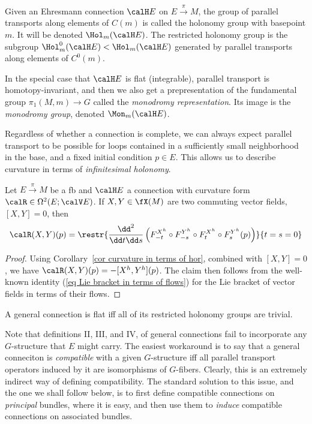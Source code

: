 \begin{defn}
    Given an Ehresmann connection $\calH E$ on $E\overset{\pi}{\to}M$, the group of parallel transports along elements of $C(m)$ is called the holonomy group  with basepoint $m$. It will be denoted $\Hol_m(\calH E)$. The restricted holonomy group is the subgroup $\Hol^0_m(\calH E)<\Hol_m(\calH E)$ generated by parallel transports along elements of $C^0(m)$.
\end{defn}

\begin{defn}
    In the special case that $\calH E$ is flat (integrable), parallel transport is homotopy-invariant, and then we also get a prepresentation of the fundamental group $\pi_1(M,m)\to G$ called the \emph{monodromy representation}. Its image is the \emph{monodromy group}, denoted $\Mon_m(\calH E)$.
\end{defn}

Regardless of whether a connection is complete, we can always expect parallel transport to be possible for loops contained in a sufficiently small neighborhood in the base, and a fixed initial condition $p\in E$. This allows us to describe curvature in terms of \emph{infinitesimal holonomy}.

\begin{prop}
    Let $E\overset{\pi}{\to}M$ be a \gls{fb} and $\calH E$ a connection with curvature form $\calR\in\Omega^2(E;\calV E)$. If $X,Y\in\fX(M)$ are two commuting vector fields, $[X,Y]=0$, then 
    \[\calR(X,Y)(p)=\restr{\frac{\dd^2}{\dd t\dd s}\left(
    F^{X^h}_{-t}\circ F^{Y^h}_{-s}\circ F^{X^h}_t\circ F^{Y^h}_s(p)
    \right)}{t=s=0}\]
\end{prop}
\begin{proof}
    Using Corollary~\ref{cor curvature in terms of hor}, combined with $[X,Y]=0$, we have $\calR(X,Y)(p)=-[X^h,Y^h](p)$. The claim then follows from the well-known identity (\ref{eq Lie bracket in terms of flows}) for the Lie bracket of vector fields in terms of their flows.
\end{proof}
\begin{cor}
    A general connection is flat iff all of its restricted holonomy groups are trivial.
\end{cor}

\begin{rem}
    Note that definitions II, III, and IV, of general connections fail to incorporate any $G$-structure that $E$ might carry. The easiest workaround is to say that a general conneciton is \emph{compatible} with a given $G$-structure iff all parallel transport operators induced by it are isomorphisms of $G$-fibers. Clearly, this is an extremely indirect way of defining compatibility. The standard solution to this issue, and the one we shall follow below, is to first define compatible connections on \emph{principal} bundles, where it is easy, and then use them to \emph{induce} compatible connections on associated bundles.
\end{rem}







